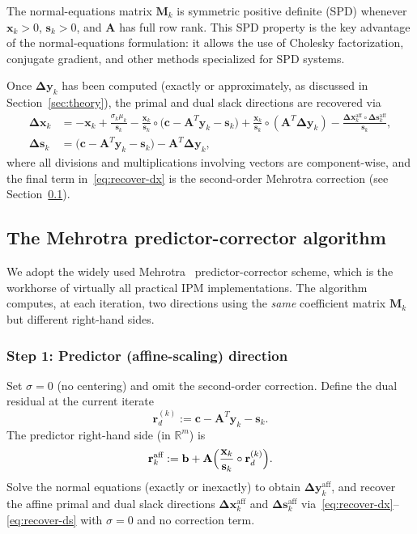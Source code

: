 \documentclass[11pt,twoside]{article}
\newcommand{\R}{\mathbb{R}}
\newcommand{\bA}{\mathbf{A}}
\newcommand{\bb}{\mathbf{b}}
\newcommand{\bc}{\mathbf{c}}
\newcommand{\bx}{\mathbf{x}}
\newcommand{\by}{\mathbf{y}}
\newcommand{\bs}{\mathbf{s}}
\newcommand{\bM}{\mathbf{M}}
\newcommand{\br}{\mathbf{r}}
\newcommand{\bDelta}{\mathbf{\Delta}}
\begin{document}
The normal-equations matrix $\bM_k$ is symmetric positive definite (SPD)
whenever $\bx_k > 0$, $\bs_k > 0$, and $\bA$ has full row rank.  This
SPD property is the key advantage of the normal-equations formulation: it
allows the use of Cholesky factorization, conjugate gradient, and other
methods specialized for SPD systems.

Once $\bDelta\by_k$ has been computed (exactly or approximately, as
discussed in Section~\ref{sec:theory}), the primal and dual slack
directions are recovered via
\begin{align}
  \bDelta\bx_k &=
    -\bx_k
    + \frac{\sigma_k\mu_k}{\bs_k}
    - \frac{\bx_k}{\bs_k} \circ \bigl(\bc - \bA^T\by_k - \bs_k\bigr)
    + \frac{\bx_k}{\bs_k} \circ (\bA^T\bDelta\by_k)
    - \frac{\bDelta\bx_k^{\text{aff}} \circ \bDelta\bs_k^{\text{aff}}}{\bs_k},
    \label{eq:recover-dx} \\[4pt]
  \bDelta\bs_k &=
    \bigl(\bc - \bA^T\by_k - \bs_k\bigr) - \bA^T\bDelta\by_k,
    \label{eq:recover-ds}
\end{align}
where all divisions and multiplications involving vectors are
component-wise, and the final term in~\eqref{eq:recover-dx} is the
second-order Mehrotra correction (see Section~\ref{sec:mehrotra}).

\subsection{The Mehrotra predictor-corrector algorithm}
\label{sec:mehrotra}

We adopt the widely used Mehrotra~\cite{Mehrotra1992} predictor-corrector
scheme, which is the workhorse of virtually all practical IPM
implementations.  The algorithm computes, at each iteration, two
directions using the \emph{same} coefficient matrix $\bM_k$ but different
right-hand sides.

\subsubsection{Step 1: Predictor (affine-scaling) direction}

Set $\sigma = 0$ (no centering) and omit the second-order correction.
Define the dual residual at the current iterate
\begin{equation}
  \br_d^{(k)} := \bc - \bA^T\by_k - \bs_k.
  \label{eq:rd}
\end{equation}
The predictor right-hand side (in $\R^m$) is
\begin{equation}
  \br_k^{\text{aff}} := \bb + \bA\Bigl(\frac{\bx_k}{\bs_k}
                         \circ \br_d^{(k)}\Bigr).
  \label{eq:r-aff}
\end{equation}
Solve the normal equations (exactly or inexactly) to obtain
$\bDelta\by_k^{\text{aff}}$, and recover the affine primal and dual slack
directions $\bDelta\bx_k^{\text{aff}}$ and $\bDelta\bs_k^{\text{aff}}$
via~\eqref{eq:recover-dx}--\eqref{eq:recover-ds} with $\sigma=0$ and no
correction term.
\end{document}
